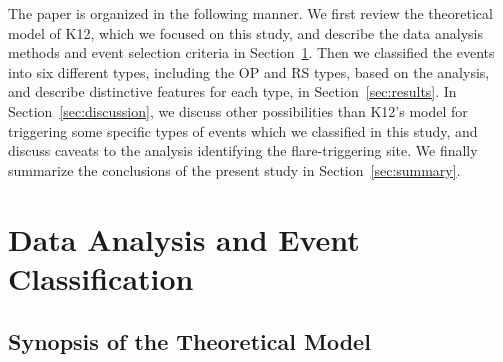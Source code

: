 \documentclass[10pt,preprint2]{aastex}
\begin{document}
The paper is organized in the following manner.
We first review the theoretical model of K12, which we focused on this study, and describe the data analysis methods and event selection criteria in Section~\ref{sec:data_analysis}.
Then we classified the events into six different types, including the OP and RS types, based on the analysis, and describe distinctive features for each type, in Section~\ref{sec:results}.
In Section~\ref{sec:discussion}, we discuss other possibilities than K12's model for triggering some specific types of events which we classified in this study, and discuss caveats to the analysis identifying the flare-triggering site.
We finally summarize the conclusions of the present study in Section~\ref{sec:summary}.


\section{Data Analysis and Event Classification} \label{sec:data_analysis}

\subsection{Synopsis of the Theoretical Model} \label{sec:KB12}
\end{document}
